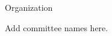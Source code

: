 \documentclass[letterpaper,compsoc,onecolumn,oneside,english]{IEEEtran}
\begin{document}
\Large{Organization}

Add committee names here.
\end{document}
